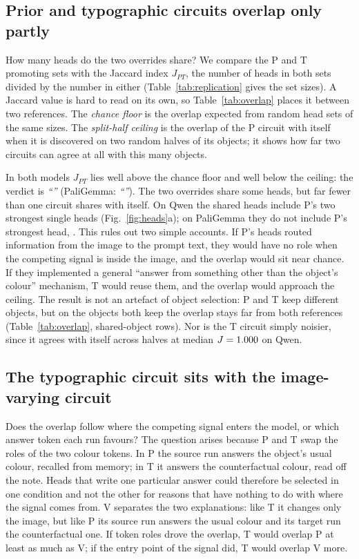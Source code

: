\documentclass[letterpaper]{article}
\begin{document}
\subsection{Prior and typographic circuits overlap only partly}\label{sec:overlap}
How many heads do the two overrides share? We compare the P and T promoting
sets with the Jaccard index $J_{PT}$, the number of heads in both sets divided
by the number in either (Table~\ref{tab:replication} gives the set sizes). A
Jaccard value is hard to read on its own, so Table~\ref{tab:overlap} places it
between two references. The \emph{chance floor} is the overlap expected from
random head sets of the same sizes. The \emph{split-half ceiling} is the
overlap of the P circuit with itself when it is discovered on two random halves
of its objects; it shows how far two circuits can agree at all with this many
objects.

In both models $J_{PT}$ lies well above the chance floor and well below the
ceiling: the verdict is \emph{``\JPTVerdict''} (PaliGemma:
\emph{``\pgJPTVerdict''}). The two overrides share some heads, but far fewer
than one circuit shares with itself. On Qwen the shared heads include P's two
strongest single heads (Fig.~\ref{fig:heads}a); on PaliGemma they do not
include P's strongest head, \pgTopOne. This rules out two simple accounts. If
P's heads routed information from the image to the prompt text, they would have
no role when the competing signal is inside the image, and the overlap would
sit near chance. If they implemented a general ``answer from something other
than the object's colour'' mechanism, T would reuse them, and the overlap would
approach the ceiling. The result is not an artefact of object selection: P and
T keep different objects, but on the objects both keep the overlap stays far
from both references (Table~\ref{tab:overlap}, shared-object rows). Nor is the T
circuit simply noisier, since it agrees with itself across halves at median
$J=1.000$ on Qwen.

\subsection{The typographic circuit sits with the image-varying circuit}\label{sec:v}
Does the overlap follow where the competing signal enters the model, or which
answer token each run favours? The question arises because P and T swap the
roles of the two colour tokens. In P the source run answers the object's usual
colour, recalled from memory; in T it answers the counterfactual colour, read
off the note. Heads that write one particular answer could therefore be selected
in one condition and not the other for reasons that have nothing to do with
where the signal comes from. V separates the two explanations: like T it
changes only the image, but like P its source run answers the usual colour and
its target run the counterfactual one. If token roles drove the overlap, T would
overlap P at least as much as V; if the entry point of the signal did, T would
overlap V more.
\end{document}

